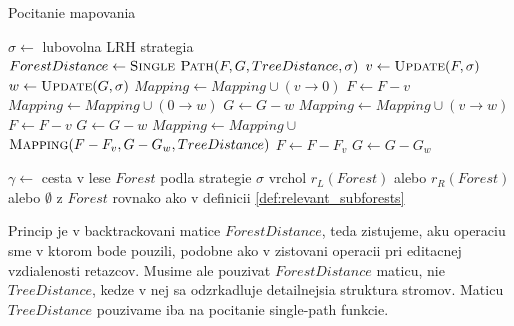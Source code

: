 \begin{algorithm}
  \caption{Pocitanie mapovania}
  \label{alg:ted:mapping}
  \begin{algorithmic}[1]
      \State $\sigma \gets$ lubovolna LRH strategia
      \State $ForestDistance \gets \Call{Single Path}{F, G, TreeDistance, \sigma}$
        \State $v \gets \Call{Update}{F, \sigma}$
        \State $w \gets \Call{Update}{G, \sigma}$
          \State $Mapping \gets Mapping \cup (v \rightarrow 0)$
          \State $F \gets F - v$
          \State $Mapping \gets Mapping \cup (0 \rightarrow w)$
          \State $G \gets G - w$
        \Else
            \State $Mapping \gets Mapping \cup (v \rightarrow w)$
            \State $F \gets F - v$
            \State $G \gets G - w$
          \Else
            \State $Mapping \gets Mapping \cup$
            \Indent
              \State $\Call{Mapping}{F - F_{v}, G - G_{w}, TreeDistance}$
            \EndIndent
            \State $F \gets F - F_{v}$
            \State $G \gets G - G_{w}$
          \EndIf
        \EndIf
      \EndWhile
    \EndProcedure
  \item[]
      \State $\gamma \gets$ cesta v lese $Forest$ podla strategie $\sigma$
      \State \Return vrchol $r_{L}(Forest)$ alebo $r_{R}(Forest)$ alebo
        $\emptyset$ z $Forest$
        \Indent
          \State rovnako ako v definicii \ref{def:relevant_subforests}
        \EndIndent
      \label{alg:ted:mapping:update}
    \EndProcedure
  \end{algorithmic}
\end{algorithm}

Princip je v backtrackovani matice $ForestDistance$, teda zistujeme, aku operaciu sme v ktorom
bode pouzili, podobne ako v zistovani operacii pri editacnej vzdialenosti retazcov.
Musime ale pouzivat $ForestDistance$ maticu, nie $TreeDistance$, kedze v nej
sa odzrkadluje detailnejsia struktura stromov. Maticu $TreeDistance$ pouzivame iba na
pocitanie single-path funkcie.


